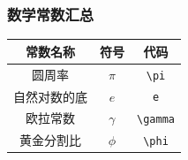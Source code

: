 \documentclass{article}
\begin{document}
\subsubsection{数学常数汇总}
\begin{center}
    \large
    \begin{tabular}{@{}ccc@{}}
        \toprule
        \textbf{常数名称} & \textbf{符号} & \textbf{代码}   \\
        \midrule
        圆周率           & $\pi$       & \verb|\pi|    \\
        自然对数的底        & $e$         & \verb|e|      \\
        欧拉常数          & $\gamma$    & \verb|\gamma| \\
        黄金分割比         & $\phi$      & \verb|\phi|   \\
        \bottomrule
    \end{tabular}
\end{center}
\end{document}
